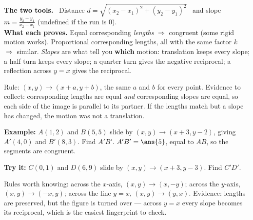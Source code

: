 \documentclass[12pt]{article}
\begin{document}

\begin{formulabox}
\textbf{The two tools.} \ Distance
$d = \sqrt{(x_2-x_1)^2 + (y_2-y_1)^2}$ \ and slope
$m = \frac{y_2-y_1}{x_2-x_1}$ (undefined if the run is $0$).\\[3pt]
\textbf{What each proves.} Equal corresponding \emph{lengths} $\Rightarrow$
congruent (some rigid motion works). Proportional corresponding lengths, all with
the same factor $k$ $\Rightarrow$ similar. \emph{Slopes} are what tell you
\textbf{which} motion: translation keeps every slope; a half turn keeps every
slope; a quarter turn gives the negative reciprocal; a reflection across
$y = x$ gives the reciprocal.
\end{formulabox}


\begin{formulabox}
Rule: $(x, y) \rightarrow (x + a, y + b)$, the same $a$ and $b$ for every point.
Evidence to collect: corresponding lengths are equal \emph{and} corresponding
slopes are equal, so each side of the image is parallel to its partner. If the
lengths match but a slope has changed, the motion was not a translation.
\end{formulabox}

\begin{examplebox}
\textbf{Example:} $A(1,2)$ and $B(5,5)$ slide by $(x,y) \rightarrow (x+3, y-2)$,
giving $A'(4,0)$ and $B'(8,3)$. Find $A'B'$.
$A'B' = \ans{5}$, equal to $AB$, so the segments are congruent.
\end{examplebox}

\begin{tryitbox}
\textbf{Try it:} $C(0,1)$ and $D(6,9)$ slide by $(x,y) \rightarrow (x+3, y-3)$.
Find $C'D'$.\\[2pt]
\end{tryitbox}


\begin{formulabox}
Rules worth knowing: across the $x$-axis, $(x,y) \rightarrow (x,-y)$; across the
$y$-axis, $(x,y) \rightarrow (-x,y)$; across the line $y = x$,
$(x,y) \rightarrow (y,x)$. Evidence: lengths are preserved, but the figure is
turned over --- across $y = x$ every slope becomes its reciprocal, which is the
easiest fingerprint to check.
\end{formulabox}
\end{document}
